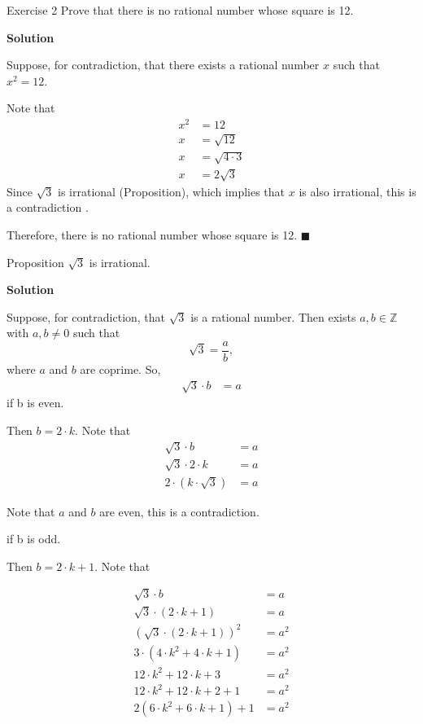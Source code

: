 \documentclass[12pt, a4paper]{article}
\begin{document}
\thispagestyle{fancy}

\begin{exercisebox}{Exercise 2}
    Prove that there is no rational number whose square is 12.
\end{exercisebox}

\textbf{Solution}

Suppose, for contradiction, that there exists a rational number $x$ such that $x^2=12$.

Note that
\[
\begin{aligned}
    x^2&=12\\
    x&=\sqrt{12}\\
    x&=\sqrt{4\cdot 3}\\
    x&= 2\sqrt{3}
\end{aligned}
\]
Since $\sqrt{3}$ is irrational (Proposition), which implies that $x$ is also irrational, this is a contradiction .

Therefore, there is no rational number whose square is 12. $\blacksquare$

\newpage

\begin{exercisebox}{Proposition}
    $\sqrt{3}$ is irrational.
\end{exercisebox}

\textbf{Solution}

Suppose, for contradiction, that $\sqrt{3}$ is a rational number. Then exists $a,b\in \mathbb{Z}$ with $a,b\neq 0$ such that
\[
\sqrt{3} = \dfrac{a}{b},
\]
where $a$ and $b$ are coprime. So,
\[
\begin{aligned}
    \sqrt{3}\cdot b &= a
\end{aligned}
\]
if b is even.

Then $b=2\cdot k$. Note that
\[
\begin{aligned}
    \sqrt{3}\cdot b &= a\\
    \sqrt{3} \cdot 2 \cdot k &= a\\
    2 \cdot (k \cdot \sqrt{3}) &= a
\end{aligned}
\]

Note that $a$ and $b$ are even, this is a contradiction.

if b is odd.

Then $b=2\cdot k + 1$. Note that

\[
\begin{aligned}
    \sqrt{3}\cdot b &= a\\
    \sqrt{3} \cdot (2\cdot k + 1) &= a\\
     (\sqrt{3} \cdot (2\cdot k + 1))^2&= a^2\\
     3 \cdot (4\cdot k^2+4 \cdot k+1)&=a^2\\
     12 \cdot k^2 + 12 \cdot k + 3&= a^2\\
     12 \cdot k^2 + 12 \cdot k + 2 + 1 &= a^2\\
     2(6 \cdot k^2 + 6 \cdot k + 1) + 1 &= a^2
\end{aligned}
\]
\end{document}

